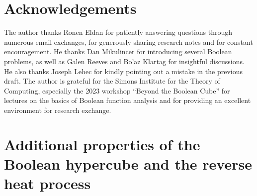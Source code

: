 \documentclass[11pt]{article}
\theoremstyle{named}
\theoremstyle{plain}
\begin{document}
\section*{Acknowledgements}
The author thanks Ronen Eldan for patiently answering questions through numerous email exchanges, for generously sharing research notes and for constant encouragement. He thanks Dan Mikulincer for introducing several Boolean problems, as well as Galen Reeves and Bo'az Klartag for insightful discussions. He also thanks Joseph Lehec for kindly pointing out a mistake in the previous draft. The author is grateful for the Simons Institute for the Theory of Computing, especially the 2023 workshop ``Beyond the Boolean Cube'' for lectures on the basics of Boolean function analysis and for providing an excellent environment for research exchange.  







\appendix


\section{Additional properties of the Boolean hypercube and the reverse heat process}
\end{document}
